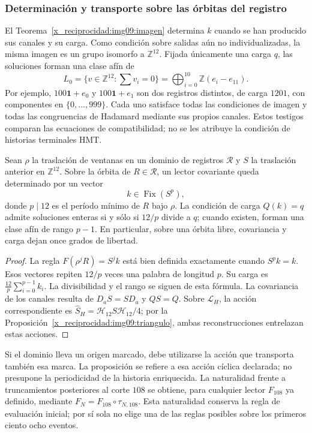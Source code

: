 \subsubsection{Determinación y transporte sobre las órbitas del registro}

El Teorema~\ref{x_reciprocidad:img09:imagen} determina $k$ cuando se han producido
sus canales y su carga. Como condición sobre salidas aún no
individualizadas, la misma imagen es un grupo isomorfo a
$\mathbb Z^{12}$. Fijada únicamente una carga $q$, las soluciones
forman una clase afín de
\[
 L_0=\{v\in\mathbb Z^{12}:\sum v_i=0\}
 =\bigoplus_{i=0}^{10}\mathbb Z(e_i-e_{11}).
\]
Por ejemplo, $100\mathbf1+e_0$ y $100\mathbf1+e_1$ son dos
registros distintos, de carga $1201$, con componentes en
$\{0,\ldots,999\}$. Cada uno satisface todas las condiciones de
imagen y todas las congruencias de Hadamard mediante sus propios
canales. Estos testigos comparan las ecuaciones de compatibilidad;
no se les atribuye la condición de historias terminales HMT.

\begin{proposition}
\label{x_reciprocidad:img09:covariancia}
Sean $\rho$ la traslación de ventanas en un dominio de registros
$\mathscr R$ y $S$ la traslación anterior en $\mathbb Z^{12}$.
Sobre la órbita de $R\in\mathscr R$, un lector covariante queda
determinado por un vector
\[
 k\in\operatorname{Fix}(S^p),
\]
donde $p\mid12$ es el período mínimo de $R$ bajo $\rho$.
La condición de carga $Q(k)=q$ admite soluciones enteras si y sólo si
$12/p$ divide a $q$; cuando existen, forman una clase afín de rango
$p-1$. En particular, sobre una órbita libre, covariancia y carga
dejan once grados de libertad.
\end{proposition}
\begin{proof}
La regla $F(\rho^jR)=S^jk$ está bien definida exactamente cuando
$S^pk=k$. Esos vectores repiten $12/p$ veces una palabra de
longitud $p$. Su carga es $\frac{12}{p}\sum_{i=0}^{p-1}k_i$.
La divisibilidad y el rango se siguen de esta fórmula. La
covariancia de los canales resulta de $D_aS=SD_a$ y $QS=Q$.
Sobre $\mathcal L_H$, la acción correspondiente es
$\widehat S_H=\mathcal H_{12}S\mathcal H_{12}/4$;
por la Proposición~\ref{x_reciprocidad:img09:triangulo}, ambas reconstrucciones
entrelazan estas acciones.
\end{proof}

Si el dominio lleva un origen marcado, debe utilizarse la acción que
transporta también esa marca. La proposición se refiere a esa acción
cíclica declarada; no presupone la periodicidad de la historia
enriquecida. La naturalidad frente a truncamientos posteriores al corte
$108$ se obtiene, para cualquier lector $F_{108}$ ya definido, mediante
$F_N=F_{108}\circ\tau_{N,108}$. Esta naturalidad conserva la regla
de evaluación inicial; por sí sola no elige una de las reglas posibles
sobre los primeros ciento ocho eventos.


